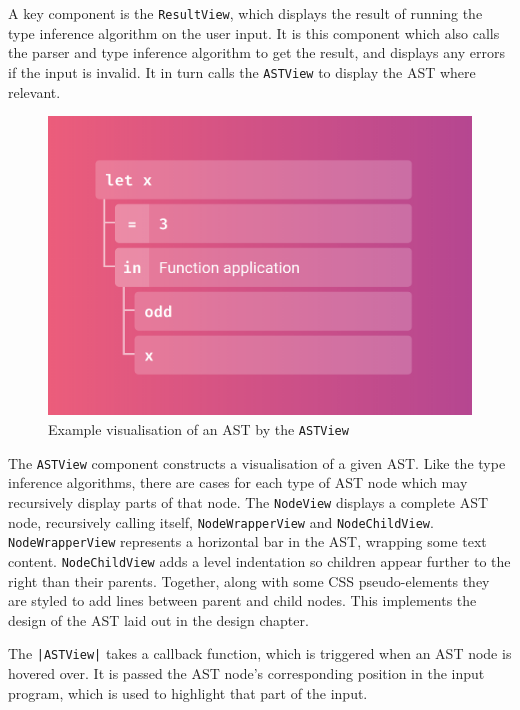 \documentclass[a4paper,fleqn,oneside,12pt]{report}
\begin{document}
A key component is the \texttt{ResultView}, which displays the result of running the type inference algorithm on the user input. It is this component which also calls the parser and type inference algorithm to get the result, and displays any errors if the input is invalid. It in turn calls the \texttt{ASTView} to display the AST where relevant.

{\centering \begin{figure}[h!]
  \centering
  \includegraphics[width=0.75\linewidth]{images/image1.png}
  \caption{Example visualisation of an AST by the \texttt{ASTView}}
\end{figure} \par}

The \texttt{ASTView} component constructs a visualisation of a given AST. Like the type inference algorithms, there are cases for each type of AST node which may recursively display parts of that node. The \texttt{NodeView} displays a complete AST node, recursively calling itself, \texttt{NodeWrapperView} and \texttt{NodeChildView}. \texttt{NodeWrapperView} represents a horizontal bar in the AST, wrapping some text content. \texttt{NodeChildView} adds a level indentation so children appear further to the right than their parents. Together, along with some CSS pseudo-elements they are styled to add lines between parent and child nodes. This implements the design of the AST laid out in the design chapter.

The \texttt{|ASTView|} takes a callback function, which is triggered when an AST node is hovered over. It is passed the AST node’s corresponding position in the input program, which is used to highlight that part of the input.
\end{document}
